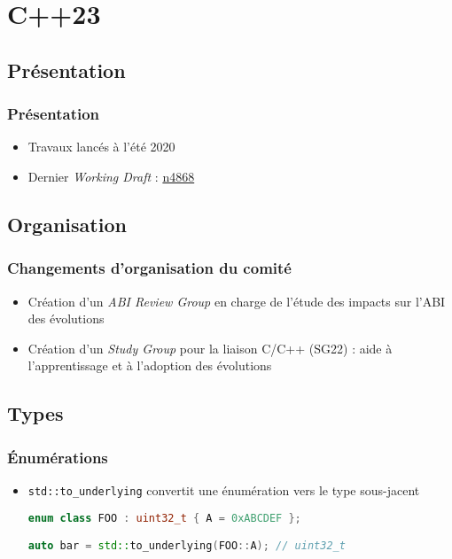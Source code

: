 \documentclass[C++.tex]{subfiles}
\begin{document}
\section{C++23}
\subsection*{Présentation}
\begin{frame}
	\frametitle{Présentation}
	\begin{itemize}
		\item Travaux lancés à l'été 2020
		\item Dernier \textit{Working Draft} : \href{https://github.com/cplusplus/draft/releases/download/n4868/n4868.pdf}{n4868}
	\end{itemize}
\end{frame}

\subsection*{Organisation}
\begin{frame}
	\frametitle{Changements d'organisation du comité}
	\begin{itemize}
		\item Création d'un \textit{ABI Review Group} en charge de l'étude des impacts sur l'ABI des évolutions
		\item Création d'un \textit{Study Group} pour la liaison C/C++ (SG22) : aide à l'apprentissage et à l'adoption des évolutions
	\end{itemize}
\end{frame}

\subsection*{Types}
\begin{frame}[fragile]
	\frametitle{Énumérations}
	\begin{itemize}
		\item \lstinline|std::to_underlying| convertit une énumération vers le type sous-jacent


\begin{lstlisting}[language=C++]
enum class FOO : uint32_t { A = 0xABCDEF };

auto bar = std::to_underlying(FOO::A); // uint32_t\end{lstlisting}
	\end{itemize}
\end{frame}
\end{document}
